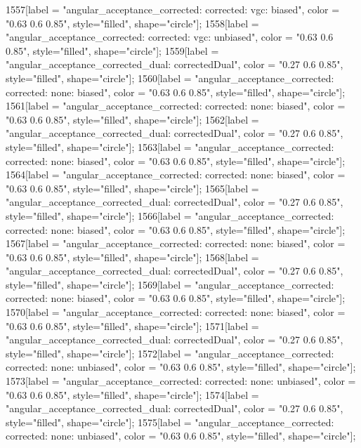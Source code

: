 {	1557[label = "angular_acceptance_corrected\nangacc: corrected\ncsp: vgc\ntrigger: biased", color = "0.63 0.6 0.85", style="filled", shape="circle"];
	1558[label = "angular_acceptance_corrected\nangacc: corrected\ncsp: vgc\ntrigger: unbiased", color = "0.63 0.6 0.85", style="filled", shape="circle"];
	1559[label = "angular_acceptance_corrected_dual\nstep: correctedDual", color = "0.27 0.6 0.85", style="filled", shape="circle"];
	1560[label = "angular_acceptance_corrected\nangacc: corrected\ncsp: none\ntrigger: biased", color = "0.63 0.6 0.85", style="filled", shape="circle"];
	1561[label = "angular_acceptance_corrected\nangacc: corrected\ncsp: none\ntrigger: biased", color = "0.63 0.6 0.85", style="filled", shape="circle"];
	1562[label = "angular_acceptance_corrected_dual\nstep: correctedDual", color = "0.27 0.6 0.85", style="filled", shape="circle"];
	1563[label = "angular_acceptance_corrected\nangacc: corrected\ncsp: none\ntrigger: biased", color = "0.63 0.6 0.85", style="filled", shape="circle"];
	1564[label = "angular_acceptance_corrected\nangacc: corrected\ncsp: none\ntrigger: biased", color = "0.63 0.6 0.85", style="filled", shape="circle"];
	1565[label = "angular_acceptance_corrected_dual\nstep: correctedDual", color = "0.27 0.6 0.85", style="filled", shape="circle"];
	1566[label = "angular_acceptance_corrected\nangacc: corrected\ncsp: none\ntrigger: biased", color = "0.63 0.6 0.85", style="filled", shape="circle"];
	1567[label = "angular_acceptance_corrected\nangacc: corrected\ncsp: none\ntrigger: biased", color = "0.63 0.6 0.85", style="filled", shape="circle"];
	1568[label = "angular_acceptance_corrected_dual\nstep: correctedDual", color = "0.27 0.6 0.85", style="filled", shape="circle"];
	1569[label = "angular_acceptance_corrected\nangacc: corrected\ncsp: none\ntrigger: biased", color = "0.63 0.6 0.85", style="filled", shape="circle"];
	1570[label = "angular_acceptance_corrected\nangacc: corrected\ncsp: none\ntrigger: biased", color = "0.63 0.6 0.85", style="filled", shape="circle"];
	1571[label = "angular_acceptance_corrected_dual\nstep: correctedDual", color = "0.27 0.6 0.85", style="filled", shape="circle"];
	1572[label = "angular_acceptance_corrected\nangacc: corrected\ncsp: none\ntrigger: unbiased", color = "0.63 0.6 0.85", style="filled", shape="circle"];
	1573[label = "angular_acceptance_corrected\nangacc: corrected\ncsp: none\ntrigger: unbiased", color = "0.63 0.6 0.85", style="filled", shape="circle"];
	1574[label = "angular_acceptance_corrected_dual\nstep: correctedDual", color = "0.27 0.6 0.85", style="filled", shape="circle"];
	1575[label = "angular_acceptance_corrected\nangacc: corrected\ncsp: none\ntrigger: unbiased", color = "0.63 0.6 0.85", style="filled", shape="circle"];
}
